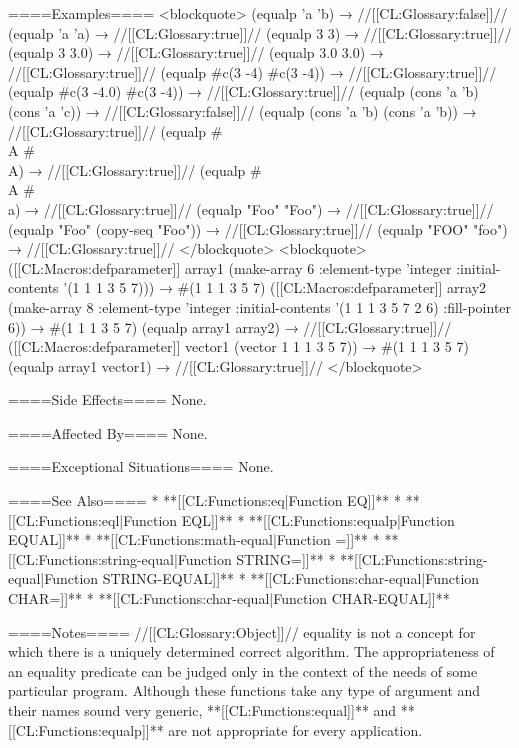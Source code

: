 ====Examples====
<blockquote> (equalp 'a 'b) → //[[CL:Glossary:false]]// (equalp 'a 'a) → //[[CL:Glossary:true]]// (equalp 3 3) → //[[CL:Glossary:true]]// (equalp 3 3.0) → //[[CL:Glossary:true]]// (equalp 3.0 3.0) → //[[CL:Glossary:true]]// (equalp #c(3 -4) #c(3 -4)) → //[[CL:Glossary:true]]// (equalp #c(3 -4.0) #c(3 -4)) → //[[CL:Glossary:true]]// (equalp (cons 'a 'b) (cons 'a 'c)) → //[[CL:Glossary:false]]// (equalp (cons 'a 'b) (cons 'a 'b)) → //[[CL:Glossary:true]]// (equalp #\\A #\\A) → //[[CL:Glossary:true]]// (equalp #\\A #\\a) → //[[CL:Glossary:true]]// (equalp "Foo" "Foo") → //[[CL:Glossary:true]]// (equalp "Foo" (copy-seq "Foo")) → //[[CL:Glossary:true]]// (equalp "FOO" "foo") → //[[CL:Glossary:true]]// </blockquote> <blockquote> ([[CL:Macros:defparameter]] array1 (make-array 6 :element-type 'integer :initial-contents '(1 1 1 3 5 7))) → #(1 1 1 3 5 7) ([[CL:Macros:defparameter]] array2 (make-array 8 :element-type 'integer :initial-contents '(1 1 1 3 5 7 2 6) :fill-pointer 6)) → #(1 1 1 3 5 7) (equalp array1 array2) → //[[CL:Glossary:true]]// ([[CL:Macros:defparameter]] vector1 (vector 1 1 1 3 5 7)) → #(1 1 1 3 5 7) (equalp array1 vector1) → //[[CL:Glossary:true]]// </blockquote>

====Side Effects====
None.

====Affected By====
None.

====Exceptional Situations====
None.

====See Also====
  * **[[CL:Functions:eq|Function EQ]]**
  * **[[CL:Functions:eql|Function EQL]]**
  * **[[CL:Functions:equalp|Function EQUAL]]**
  * **[[CL:Functions:math-equal|Function =]]**
  * **[[CL:Functions:string-equal|Function STRING=]]**
  * **[[CL:Functions:string-equal|Function STRING-EQUAL]]**
  * **[[CL:Functions:char-equal|Function CHAR=]]**
  * **[[CL:Functions:char-equal|Function CHAR-EQUAL]]**

====Notes====
//[[CL:Glossary:Object]]// equality is not a concept for which there is a uniquely determined correct algorithm. The appropriateness of an equality predicate can be judged only in the context of the needs of some particular program. Although these functions take any type of argument and their names sound very generic, **[[CL:Functions:equal]]** and **[[CL:Functions:equalp]]** are not appropriate for every application.

  
